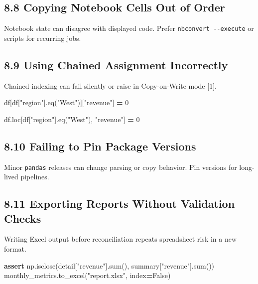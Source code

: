 \documentclass[
  12pt,
]{article}
\newenvironment{Shaded}{\begin{snugshade}}{\end{snugshade}}
\newcommand{\BuiltInTok}[1]{#1}
\newcommand{\ControlFlowTok}[1]{\textcolor[rgb]{0.13,0.29,0.53}{\textbf{#1}}}
\newcommand{\DecValTok}[1]{\textcolor[rgb]{0.00,0.00,0.81}{#1}}
\newcommand{\NormalTok}[1]{#1}
\newcommand{\OperatorTok}[1]{\textcolor[rgb]{0.81,0.36,0.00}{\textbf{#1}}}
\newcommand{\StringTok}[1]{\textcolor[rgb]{0.31,0.60,0.02}{#1}}
\newcommand{\VariableTok}[1]{\textcolor[rgb]{0.00,0.00,0.00}{#1}}
\begin{document}
\subsection{8.8 Copying Notebook Cells Out of
Order}\label{copying-notebook-cells-out-of-order}

Notebook state can disagree with displayed code. Prefer
\texttt{nbconvert\ -\/-execute} or scripts for recurring jobs.

\subsection{8.9 Using Chained Assignment
Incorrectly}\label{using-chained-assignment-incorrectly}

Chained indexing can fail silently or raise in Copy-on-Write mode
{[}1{]}.

\begin{Shaded}
\begin{Highlighting}[]
\NormalTok{df[df[}\StringTok{"region"}\NormalTok{].eq(}\StringTok{"West"}\NormalTok{)][}\StringTok{"revenue"}\NormalTok{] }\OperatorTok{=} \DecValTok{0}

\NormalTok{df.loc[df[}\StringTok{"region"}\NormalTok{].eq(}\StringTok{"West"}\NormalTok{), }\StringTok{"revenue"}\NormalTok{] }\OperatorTok{=} \DecValTok{0}
\end{Highlighting}
\end{Shaded}

\subsection{8.10 Failing to Pin Package
Versions}\label{failing-to-pin-package-versions}

Minor \texttt{pandas} releases can change parsing or copy behavior. Pin
versions for long-lived pipelines.

\subsection{8.11 Exporting Reports Without Validation
Checks}\label{exporting-reports-without-validation-checks}

Writing Excel output before reconciliation repeats spreadsheet risk in a
new format.

\begin{Shaded}
\begin{Highlighting}[]
\ControlFlowTok{assert}\NormalTok{ np.isclose(detail[}\StringTok{"revenue"}\NormalTok{].}\BuiltInTok{sum}\NormalTok{(), summary[}\StringTok{"revenue"}\NormalTok{].}\BuiltInTok{sum}\NormalTok{())}
\NormalTok{monthly\_metrics.to\_excel(}\StringTok{"report.xlsx"}\NormalTok{, index}\OperatorTok{=}\VariableTok{False}\NormalTok{)}
\end{Highlighting}
\end{Shaded}
\end{document}

